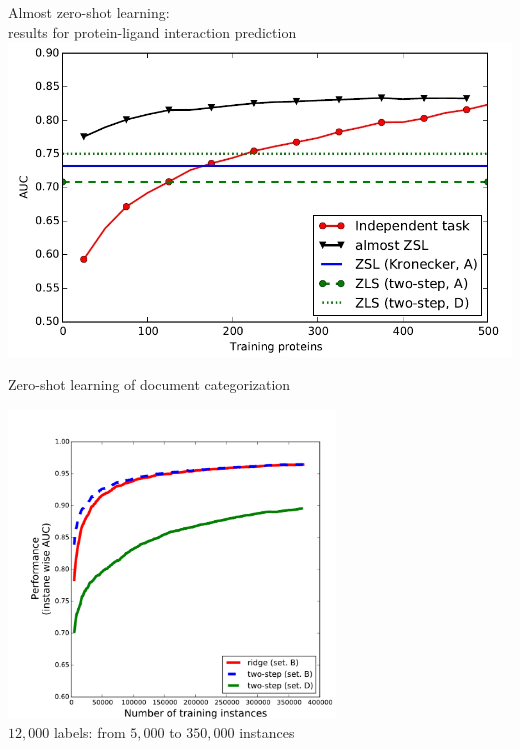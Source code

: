 \documentclass[]{beamer}
\begin{document}
\begin{frame}{Almost zero-shot learning: \\
results for protein-ligand interaction prediction}
 \center
   \includegraphics[width=\textwidth]{Figures/results4} \\
\end{frame}

\begin{frame}{Zero-shot learning of document categorization}
 \center

\vspace{-0.5cm}
   \includegraphics[width=0.65\textwidth]{Figures/lc_wiki} \\
   $12,000$ labels: from $5,000$ to $350,000$ instances
\end{frame}
\end{document}
